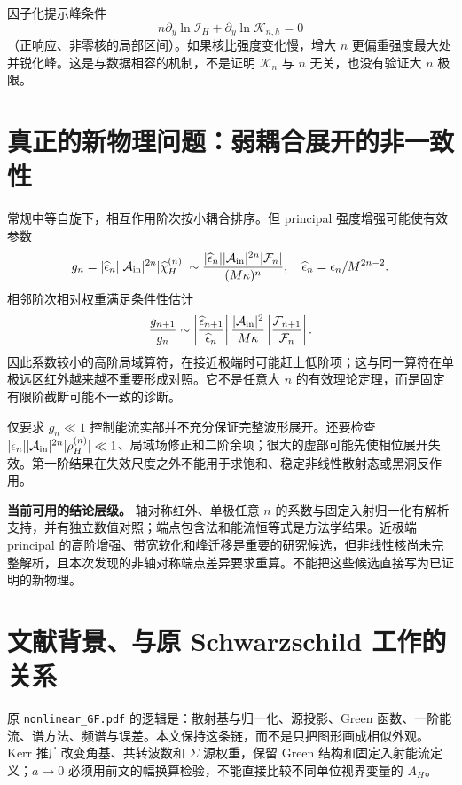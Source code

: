 因子化提示峰条件
\begin{equation}
 n\partial_y\ln\mathcal I_H+\partial_y\ln\mathcal K_{n,h}=0
\end{equation}
（正响应、非零核的局部区间）。如果核比强度变化慢，增大 $n$ 更偏重强度最大处并锐化峰。这是与数据相容的机制，不是证明 $\mathcal K_n$ 与 $n$ 无关，也没有验证大 $n$ 极限。

\section{真正的新物理问题：弱耦合展开的非一致性}
常规中等自旋下，相互作用阶次按小耦合排序。但 principal 强度增强可能使有效参数
\begin{equation}
 g_n=|\widehat\epsilon_n||\mathcal A_{\rm in}|^{2n}
 |\widehat\chi_H^{(n)}|\sim
 \frac{|\widehat\epsilon_n||\mathcal A_{\rm in}|^{2n}|\mathcal F_n|}
 {(M\kappa)^n},\quad\widehat\epsilon_n=\epsilon_n/M^{2n-2}.
\end{equation}
相邻阶次相对权重满足条件性估计
\begin{equation}
 \frac{g_{n+1}}{g_n}\sim
 \left|\frac{\widehat\epsilon_{n+1}}{\widehat\epsilon_n}\right|
 \frac{|\mathcal A_{\rm in}|^2}{M\kappa}
 \left|\frac{\mathcal F_{n+1}}{\mathcal F_n}\right|.
\end{equation}
因此系数较小的高阶局域算符，在接近极端时可能赶上低阶项；这与同一算符在单极远区红外越来越不重要形成对照。它不是任意大 $n$ 的有效理论定理，而是固定有限阶截断可能不一致的诊断。

仅要求 $g_n\ll1$ 控制能流实部并不充分保证完整波形展开。还要检查 $|\epsilon_n||\mathcal A_{\rm in}|^{2n}|\rho_H^{(n)}|\ll1$、局域场修正和二阶余项；很大的虚部可能先使相位展开失效。第一阶结果在失效尺度之外不能用于求饱和、稳定非线性散射态或黑洞反作用。

\begin{note}
\textbf{当前可用的结论层级。} 轴对称红外、单极任意 $n$ 的系数与固定入射归一化有解析支持，并有独立数值对照；端点包含法和能流恒等式是方法学结果。近极端 principal 的高阶增强、带宽软化和峰迁移是重要的研究候选，但非线性核尚未完整解析，且本次发现的非轴对称端点差异要求重算。不能把这些候选直接写为已证明的新物理。
\end{note}

\section{文献背景、与原 Schwarzschild 工作的关系}
原 \texttt{nonlinear\_GF.pdf} 的逻辑是：散射基与归一化、源投影、Green 函数、一阶能流、谱方法、频谱与误差。本文保持这条链，而不是只把图形画成相似外观。Kerr 推广改变角基、共转波数和 $\Sigma$ 源权重，保留 Green 结构和固定入射能流定义；$a\to0$ 必须用前文的幅换算检验，不能直接比较不同单位视界变量的 $A_H$。

